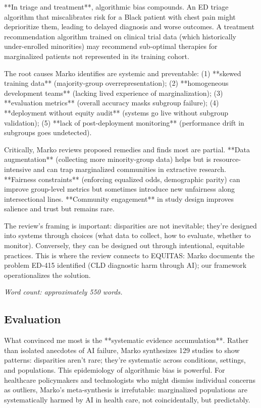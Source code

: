 \documentclass[12pt,twoside]{article}
\begin{document}
**In triage and treatment**, algorithmic bias compounds. An ED triage algorithm that miscalibrates risk for a Black patient with chest pain might deprioritize them, leading to delayed diagnosis and worse outcomes. A treatment recommendation algorithm trained on clinical trial data (which historically under-enrolled minorities) may recommend sub-optimal therapies for marginalized patients not represented in its training cohort.

The root causes Marko identifies are systemic and preventable: (1) **skewed training data** (majority-group overrepresentation); (2) **homogeneous development teams** (lacking lived experience of marginalization); (3) **evaluation metrics** (overall accuracy masks subgroup failure); (4) **deployment without equity audit** (systems go live without subgroup validation); (5) **lack of post-deployment monitoring** (performance drift in subgroups goes undetected).

Critically, Marko reviews proposed remedies and finds most are partial. **Data augmentation** (collecting more minority-group data) helps but is resource-intensive and can trap marginalized communities in extractive research. **Fairness constraints** (enforcing equalized odds, demographic parity) can improve group-level metrics but sometimes introduce new unfairness along intersectional lines. **Community engagement** in study design improves salience and trust but remains rare.

The review's framing is important: disparities are not inevitable; they're designed into systems through choices (what data to collect, how to evaluate, whether to monitor). Conversely, they can be designed out through intentional, equitable practices. This is where the review connects to EQUITAS: Marko documents the problem ED-415 identified (CLD diagnostic harm through AI); our framework operationalizes the solution.

\emph{Word count: approximately 550 words.}

\subsection*{Evaluation}

What convinced me most is the **systematic evidence accumulation**. Rather than isolated anecdotes of AI failure, Marko synthesizes 129 studies to show patterns: disparities aren't rare; they're systematic across conditions, settings, and populations. This epidemiology of algorithmic bias is powerful. For healthcare policymakers and technologists who might dismiss individual concerns as outliers, Marko's meta-synthesis is irrefutable: marginalized populations are systematically harmed by AI in health care, not coincidentally, but predictably.
\end{document}
